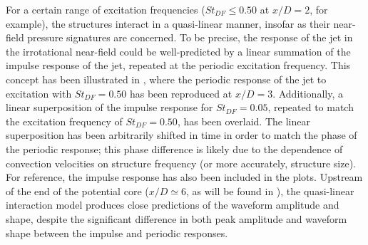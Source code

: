 For a certain range of excitation frequencies ($St_{DF} \leq 0.50$ at $x/D = 2$, for example), the structures interact in a quasi-linear manner, insofar as their near-field pressure signatures are concerned. 
To be precise, the response of the jet in the irrotational near-field could be well-predicted by a linear summation of the impulse response of the jet, repeated at the periodic excitation frequency. 
This concept has been illustrated in , where the periodic response of the jet to excitation with $St_{DF} = 0.50$ has been reproduced at $x/D = 3$. 
Additionally, a linear superposition of the impulse response for $St_{DF} = 0.05$, repeated to match the excitation frequency of $St_{DF} = 0.50$, has been overlaid. 
The linear superposition has been arbitrarily shifted in time in order to match the phase of the periodic response; this phase difference is likely due to the dependence of convection velocities on structure frequency \citep{Veltin2011} (or more accurately, structure size). 
For reference, the impulse response has also been included in the plots. 
Upstream of the end of the potential core ($x/D \simeq 6$, as will be found in ), the quasi-linear interaction model produces close predictions of the waveform amplitude and shape, despite the significant difference in both peak amplitude and waveform shape between the impulse and periodic responses. 

